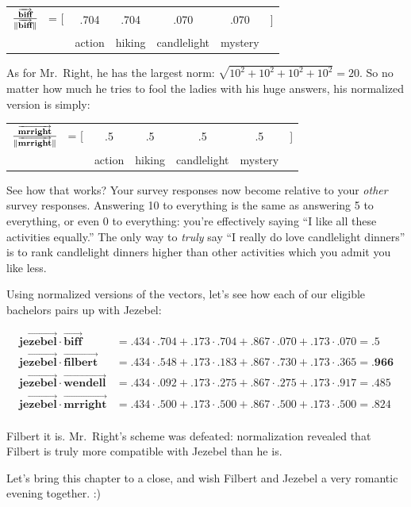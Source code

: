 \begin{center}
\begin{tabular}{cccccc}
$\frac{\overrightarrow{\textbf{biff}}}{\lVert\overrightarrow{\textbf{biff}}\rVert}$
\quad \ = [ & .704 & .704 & .070 & .070 & ] \\
& \scriptsize{action} & \scriptsize{hiking} & \scriptsize{candlelight} &
\scriptsize{mystery} & \medskip \\
\end{tabular}
\end{center}
\vspace{-.15in}

As for Mr.~Right, he has the largest norm: $\sqrt{10^2+10^2+10^2+10^2}=20$. So
no matter how much he tries to fool the ladies with his huge answers, his
normalized version is simply:

\begin{center}
\begin{tabular}{cccccc}
$\frac{\overrightarrow{\textbf{mrright}}}{\lVert\overrightarrow{\textbf{mrright}}\rVert}$
\quad \ = [ & .5 & .5 & .5 & .5 & ] \\
& \scriptsize{action} & \scriptsize{hiking} & \scriptsize{candlelight} &
\scriptsize{mystery} & \medskip \\
\end{tabular}
\end{center}
\vspace{-.15in}

See how that works? Your survey responses now become relative to your
\textit{other} survey responses. Answering 10 to everything is the
same as answering 5 to everything, or even 0 to everything: you're effectively
saying ``I like all these activities equally.'' The only way to \textit{truly}
say ``I really do love candlelight dinners'' is to rank candlelight dinners
higher than other activities which you admit you like less.

Using normalized versions of the vectors, let's see how each of our eligible
bachelors pairs up with Jezebel:

\scriptsize
\begin{align*}
\overrightarrow{\textbf{jezebel}} \cdot \overrightarrow{\textbf{biff}} &=
.434 \cdot .704 + .173 \cdot .704 + .867 \cdot .070 + .173 \cdot .070 = .5 \\
\overrightarrow{\textbf{jezebel}} \cdot \overrightarrow{\textbf{filbert}} &=
.434 \cdot .548 + .173 \cdot .183 + .867 \cdot .730  + .173 \cdot .365 =
\textbf{.966} \\
\overrightarrow{\textbf{jezebel}} \cdot \overrightarrow{\textbf{wendell}} &=
.434 \cdot .092 + .173 \cdot .275 + .867 \cdot .275 + .173 \cdot .917 = .485 \\
\overrightarrow{\textbf{jezebel}} \cdot \overrightarrow{\textbf{mrright}} &=
.434 \cdot .500 + .173 \cdot .500 + .867 \cdot .500 + .173 \cdot .500 = .824 \\
\end{align*}

\normalsize
Filbert it is. Mr.~Right's scheme was defeated: normalization revealed that
Filbert is truly more compatible with Jezebel than he is.

Let's bring this chapter to a close, and wish Filbert and Jezebel a very
romantic evening together. :)
